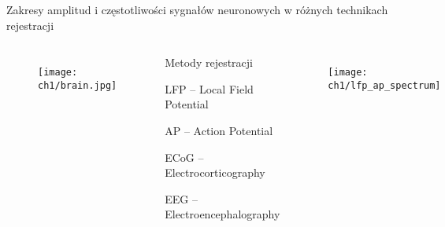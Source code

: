 \begin{frame}{Zakresy amplitud i częstotliwości sygnałów neuronowych w różnych technikach rejestracji}
    \begin{columns}
        \vspace{-2em}

        \begin{figure}[H]
            \texttt{[image: ch1/brain.jpg]}
          \end{figure}

          \begin{block}{Metody rejestracji}
            \begin{itemize}
                {\renewcommand\normalsize{\small}%
                \normalsize
                \item LFP -- Local Field Potential
                \item AP --  Action Potential
                \item ECoG -- Electrocorticography
                \item EEG -- Electroencephalography
                }
            \end{itemize}
        \end{block}


        \vspace{-2em}

        \begin{figure}[H]
            \centering
            \texttt{[image: ch1/lfp\_ap\_spectrum]}  
            \end{figure}	
    \end{columns}
    
\end{frame}

